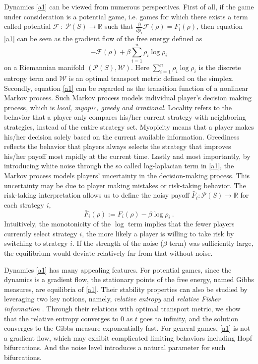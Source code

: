 \documentclass[11pt,reqno]{amsart}
\begin{document}
Dynamics \eqref{a1} can be viewed from numerous
perspectives. First of all, if the game under consideration is a potential
game, i.e. games for which there exists a term called potential
$\mathcal{F}~:~\mathcal{P}(S)\rightarrow \mathbb{R}$ such that  
$
\frac{\partial}{\partial\rho_i}\mathcal{F}(\rho)=F_i(\rho)
$,
then equation \eqref{a1} can be seen as the gradient flow of the free energy defined as
$$
-\mathcal{F}(\rho)+\beta\sum_{i=1}^n\rho_i\log\rho_i
$$ on a Riemannian manifold $(\mathcal{P}(S), \mathcal{W})$. Here $\sum_{i=1}^n\rho_i\log\rho_i$ is the discrete entropy term and $\mathcal{W}$ is an optimal transport metric defined on the simplex. Secondly, equation \eqref{a1} can be regarded as the transition function of a
nonlinear Markov process. Such Markov process models
individual player's decision making process, which is \textit{local, myopic, greedy and
irrational}. Locality refers to the behavior that a player only compares his/her current
strategy with neighboring strategies, instead of the entire strategy
set. Myopicity means that a player makes his/her decision solely based on the current
available information. Greediness reflects the behavior that players always
selects the strategy that improves his/her payoff most rapidly at the current
time. Lastly and most importantly, by introducing white noise through the so
called log-laplacian term in \eqref{a1}, the Markov process models players'
uncertainty in the decision-making process. This uncertainty may be due to player
making mistakes or risk-taking behavior. The risk-taking interpretation allows us to define the noisy payoff $\bar F_i\colon\mathcal{P}(S)\rightarrow \mathbb{R}$ for each strategy $i$, 
\begin{equation}\label{noisy-payoff}
\bar F_i(\rho):=F_{i}(\rho)-\beta\log\rho_{i}\ .
\end{equation}
Intuitively, the monotonicity of the $\log$ term implies that the fewer players
currently select strategy $i$, the more likely a player is willing to take risk
by switching to strategy $i$. If the strength of the noise ($\beta$ term) was
sufficiently large, the equilibrium would deviate relatively far from that
without noise. 

Dynamics \eqref{a1} has many appealing features. For potential games, since the dynamics is a gradient flow, the stationary points of the free energy, named Gibbs measures, are equilibria of \eqref{a1}. Their stability properties can also be studied by leveraging two key notions, namely, {\em relative entropy} and {\em relative Fisher information} \cite{Fisher, vil2008}. Through their relations with optimal transport metric, we show that the relative entropy converges to 0 as $t$ goes to infinity, and the solution converges to the Gibbs measure exponentially fast. For general games, \eqref{a1} is not a gradient flow, which may exhibit complicated limiting behaviors including Hopf bifurcations. And the noise level introduces a natural parameter for such bifurcations. 
\end{document}
